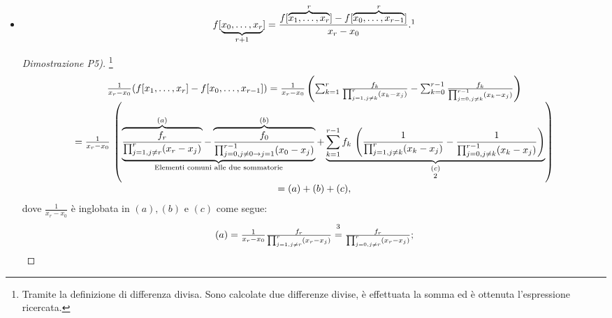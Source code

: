 \begin{property}
\begin{itemize}
		\item[P5)] \begin{equation}\label{eq:P5_differenze_divise}
			f[\underbrace{x_0,\hdots,x_r}_{r+1}]=\frac{f[\overbrace{x_1,\hdots,x_r}^{r}]-f[\overbrace{x_0,\hdots,x_{r-1}}^{r}]}{x_r-x_0}.\footnotemark
		\end{equation}
		\begin{proof}[Dimostrazione P5)] \footnote{Tramite la definizione di differenza divisa. Sono calcolate due differenze divise, è effettuata la somma ed è ottenuta l'espressione ricercata.}
			\begin{equation}\label{eq:dimostrazione_proprieta_differenza_divisa}
				\begin{matrix}
					\frac{1}{x_r-x_0}(f[x_1,\hdots, x_r]-f[x_0,\hdots,x_{r-1}]) = \frac{1}{x_r-x_0}\left(\sum_{k=1}^r\frac{f_k}{\prod_{j=1,j\neq k}^r(x_k-x_j)}-\sum_{k=0}^{r-1}\frac{f_k}{\prod_{j=0,j\neq k}^{r-1}(x_k-x_j)}\right)\\
					= \frac{1}{x_r-x_0}\,\left(\underbrace{\overbrace{\frac{f_r}{\prod_{j=1,j\neq r}^r(x_r-x_j)}}^{(a)}-\overbrace{\frac{f_0}{\prod_{j=0,j\neq 0\rightarrow j=1}^{r-1}(x_0-x_j)}}^{(b)}}_{\text{Elementi comuni alle due sommatorie}}+\underbrace{\sum_{k=1}^{r-1}f_k\,\left(\frac{1}{\prod_{j=1,j\neq k}^r(x_k-x_j)}-\frac{1}{\prod_{j=0,j\neq k}^{r-1}(x_k-x_j)}\right)}_{\underset{\footnotemark}{(c)}}\right)\\
					=(a)+(b)+(c),
				\end{matrix}
			\end{equation}
			dove $\frac{1}{x_r-x_0}$ è inglobata in $(a),(b)$ e $(c)$ come segue:
			\begin{equation*} 
				\begin{matrix}
					(a) = \frac{1}{x_r-x_0}\frac{f_r}{\prod_{j=1,j\neq r}^r(x_r-x_j)}\overset{\footnotemark}{=}\frac{f_r}{\prod_{j=0,j\neq r}^r(x_r-x_j)};\\

\end{matrix}
\end{equation*}
\end{proof}
\end{itemize}
\end{property}
